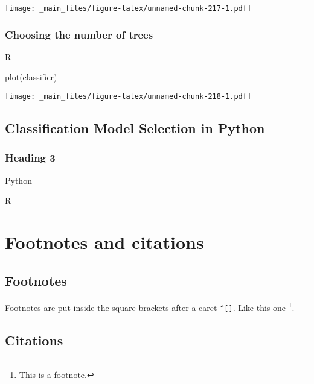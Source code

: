 \documentclass[
]{book}
\newenvironment{Shaded}{\begin{snugshade}}{\end{snugshade}}
\newcommand{\FunctionTok}[1]{\textcolor[rgb]{0.00,0.00,0.00}{#1}}
\newcommand{\NormalTok}[1]{#1}
\theoremstyle{definition}
\theoremstyle{definition}
\theoremstyle{definition}
\theoremstyle{definition}
\theoremstyle{remark}
\begin{document}
\texttt{[image: \_main\_files/figure-latex/unnamed-chunk-217-1.pdf]}

\hypertarget{choosing-the-number-of-trees}{%
\subsection{Choosing the number of trees}\label{choosing-the-number-of-trees}}

R

\begin{Shaded}
\begin{Highlighting}[]
\FunctionTok{plot}\NormalTok{(classifier)}
\end{Highlighting}
\end{Shaded}

\texttt{[image: \_main\_files/figure-latex/unnamed-chunk-218-1.pdf]}

\hypertarget{classification-model-selection-in-python}{%
\section{Classification Model Selection in Python}\label{classification-model-selection-in-python}}

\hypertarget{heading-3}{%
\subsection{Heading 3}\label{heading-3}}

Python

R

\hypertarget{footnotes-and-citations}{%
\chapter{Footnotes and citations}\label{footnotes-and-citations}}

\hypertarget{footnotes}{%
\section{Footnotes}\label{footnotes}}

Footnotes are put inside the square brackets after a caret \texttt{\^{}{[}{]}}. Like this one \footnote{This is a footnote.}.

\hypertarget{citations}{%
\section{Citations}\label{citations}}
\end{document}
